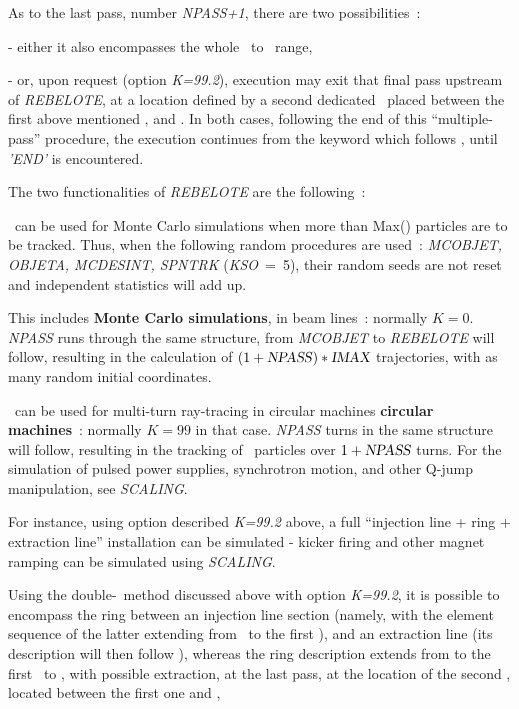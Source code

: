 \noindent As to the last pass, number  \textsl{NPASS+1}, there are two possibilities~: 

- either it also encompasses the whole \LABEL\ to  \REBELOTE\ range, 

- or, upon request (option \textsl{K=99.2}),  execution may exit that final  pass upstream of 
\textsl{REBELOTE}, at a location defined by a second   dedicated \LABEL\ placed  between 
the first above mentioned \LABEL, and \REBELOTE. 
In both cases, following the end of this ``multiple-pass'' procedure, 
the execution  continues from the keyword which follows \REBELOTE, until \textsl{'END'} is encountered. 

\bigskip

\noindent The two functionalities of \textsl{REBELOTE} are the following~: 

\medskip

\noindent {\small $\bullet$} \REBELOTE\ can be used for Monte Carlo simulations when more 
than Max(\IMAX) particles   are to be tracked. 
Thus, when the following random procedures 
are used~: \textsl{MCOBJET, OBJETA, MCDESINT, 
SPNTRK} \mbox{(\textsl{KSO} = 5)},
their random seeds are not reset and  independent statistics will add up. 

\noindent This includes  \textbf{Monte Carlo simulations}, in beam lines~: normally $ K=0$.  \textsl{NPASS} runs
through the same structure, from \textsl{MCOBJET} to \textsl{REBELOTE} will follow, resulting in the calculation of 
$(1+\text{\textsl{NPASS}})  \ast  \text{\ensuremath{\textsl{IMAX}}}$ trajectories, with as many random initial coordinates. 

\bigskip

\noindent {\small $\bullet$} \REBELOTE\ can be used for  multi-turn ray-tracing   
in circular machines \textbf{circular machines}~: normally $ K=99$ in that case.  \textsl{NPASS} turns in
the same structure will follow, resulting in the tracking of \IMAX\ 
particles over $1+\text{\textsl{NPASS}}$ turns. For the simulation of 
pulsed power supplies, synchrotron motion, and other Q-jump manipulation, see \textsl{SCALING}. 

\noindent For instance, using option described \textsl{K=99.2} above, a full ``injection line + ring + extraction line'' installation 
can be simulated - kicker firing  and other magnet ramping can be simulated using \textsl{SCALING}. 

\noindent Using the double-\LABEL\ method discussed above with option \textsl{K=99.2}, it is possible to encompass the ring between 
an injection line section (namely, with the element sequence of the latter extending from \OBJET\ to the first \LABEL), 
and an extraction line (its description will then follow \REBELOTE), 
whereas the ring description extends  from  to the first \LABEL\ to \REBELOTE, 
with possible extraction, at the last pass, at the location of the second \LABEL, located between the first one and \REBELOTE, 

